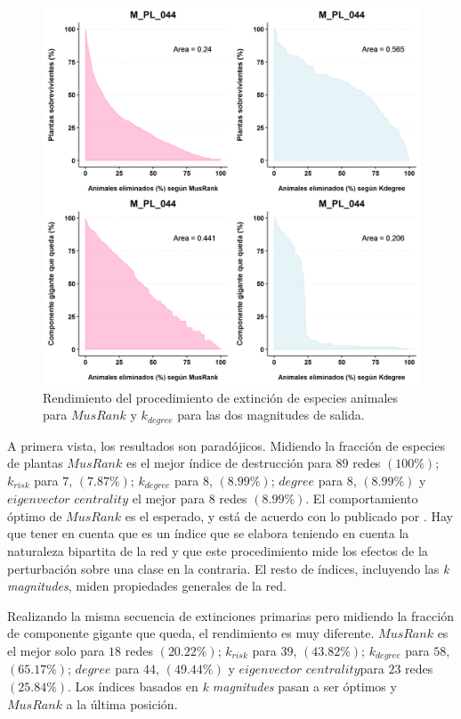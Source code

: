 \begin{figure}[h!]
\centering
\includegraphics[scale=0.55]{Figures/DEST_M_PL_044_juanmamethod_extinction_plot.png}
\caption {Rendimiento del procedimiento de extinción de especies animales para $MusRank$ y ${k}_{degree}$ para las dos magnitudes de salida.}
\label{fig:DEST_M_PL_044_juanmamethod_extinction_plot}
\end{figure}

A primera vista, los resultados son paradójicos. Midiendo la fracción de especies de plantas $MusRank$ es el mejor índice de destrucción para $89$ redes $(100\%)$; $k_{risk}$ para $7$, $(7.87\%)$; $k_{degree}$ para $8$, $(8.99\%)$; $degree$ para $8$, $(8.99\%)$ y $eigenvector$ $centrality$ el mejor para $8$ redes $(8.99\%)$. El comportamiento óptimo de $MusRank$ es el esperado, y está de acuerdo con lo publicado por \cite{dominguez2015ranking}. Hay que tener en cuenta que es un índice que se elabora teniendo en cuenta la naturaleza bipartita de la red y que este procedimiento mide los efectos de la perturbación sobre una clase en la contraria. El resto de índices, incluyendo las \textit{k magnitudes}, miden propiedades generales de la red.

Realizando la misma secuencia de extinciones primarias pero midiendo la fracción de componente gigante que queda, el rendimiento es muy diferente. $MusRank$ es el mejor solo para $18$ redes $(20.22\%)$; $k_{risk}$ para $39$, $(43.82\%)$; $k_{degree}$ para $58$, $(65.17\%)$; $degree$ para $44$, $(49.44\%)$ y $eigenvector$ $centrality$para $23$ redes $(25.84\%)$. Los índices basados en \textit{k magnitudes} pasan a ser óptimos y $MusRank$ a la última posición.

